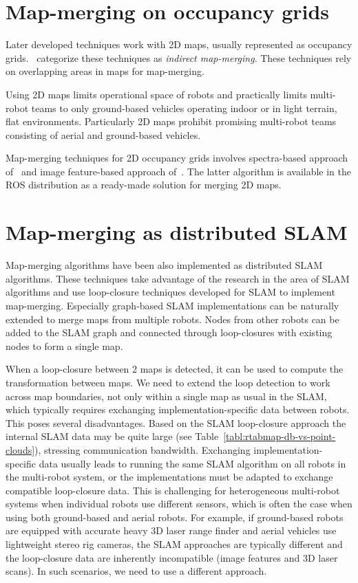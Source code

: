 \section{Map-merging on occupancy grids}

Later developed techniques work with \gls{2D} maps, usually represented as occupancy grids. \citet{lee2012survey}~categorize these techniques as \textit{indirect map-merging}. These techniques rely on overlapping areas in maps for map-merging.

Using \gls{2D} maps limits operational space of robots and practically limits multi-robot teams to only ground-based vehicles operating indoor or in light terrain, flat environments. Particularly \gls{2D} maps prohibit promising multi-robot teams consisting of aerial and ground-based vehicles.

Map-merging techniques for \gls{2D} occupancy grids involves spectra-based approach of~\citet{carpin2008spectra} and image feature-based approach of~\citet{Horner2016}. The latter algorithm is available in the \gls{ROS} distribution as a ready-made solution for merging \gls{2D} maps.

\section{Map-merging as distributed SLAM}

Map-merging algorithms have been also implemented as distributed \gls{SLAM} algorithms. These techniques take advantage of the research in the area of \gls{SLAM} algorithms and use loop-closure techniques developed for \gls{SLAM} to implement map-merging. Especially graph-based \gls{SLAM} implementations can be naturally extended to merge maps from multiple robots. Nodes from other robots can be added to the \gls{SLAM} graph and connected through loop-closures with existing nodes to form a single map.

When a loop-closure between 2 maps is detected, it can be used to compute the transformation between maps. We need to extend the loop detection to work across map boundaries, not only within a single map as usual in the \gls{SLAM}, which typically requires exchanging implementation-specific data between robots. This poses several disadvantages. Based on the \gls{SLAM} loop-closure approach the internal \gls{SLAM} data may be quite large (see Table~\ref{tabl:rtabmap-db-vs-point-clouds}), stressing communication bandwidth. Exchanging implementation-specific data usually leads to running the same \gls{SLAM} algorithm on all robots in the multi-robot system, or the implementations must be adapted to exchange compatible loop-closure data. This is challenging for heterogeneous multi-robot systems when individual robots use different sensors, which is often the case when using both ground-based and aerial robots. For example, if ground-based robots are equipped with accurate heavy \gls{3D} laser range finder and aerial vehicles use lightweight stereo rig cameras, the \gls{SLAM} approaches are typically different and the loop-closure data are inherently incompatible (image features and \gls{3D} laser scans). In such scenarios, we need to use a different approach.

